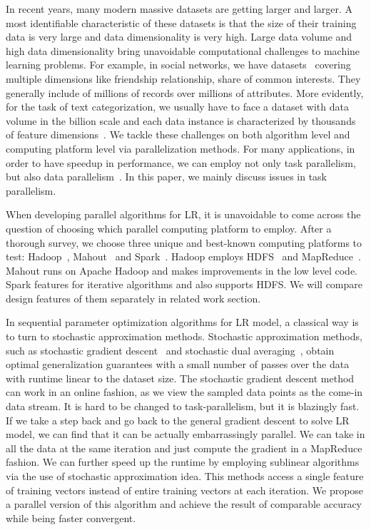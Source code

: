 \documentclass[10pt, conference, compsocconf]{IEEEtran}
\begin{document}
In recent years, many modern massive datasets are getting larger and larger.
A most identifiable characteristic of these datasets is that the size of their training data is very large and data dimensionality is very high.
Large data volume and high data dimensionality bring unavoidable computational challenges to machine learning problems.
For example, in social networks, we have datasets~\cite{lewis2008tastes} covering multiple dimensions like friendship relationship, share of common interests. They generally include of millions of records over millions of attributes. More evidently, for the task of text categorization, we usually have to face a dataset with data volume in the billion scale and each data instance is characterized by thousands of feature dimensions~\cite{lewis2004rcv1}.
We tackle these challenges on both algorithm level and computing platform level via parallelization methods.
For many applications, in order to have speedup in performance, we can employ not only task parallelism, but also data parallelism~\cite{subhlok1993exploiting}.
In this paper, we mainly discuss issues in task parallelism.

When developing parallel algorithms for LR, it is unavoidable to come across the question of choosing which parallel computing platform to employ.
After a thorough survey, we choose three unique and best-known computing platforms to test: Hadoop~\cite{white2012hadoop}, Mahout~\cite{mahoutscalable} and Spark~\cite{zaharia2010spark}.
Hadoop employs HDFS~\cite{borthakur2008hdfs} and MapReduce~\cite{dean2008mapreduce}.
Mahout runs on Apache Hadoop and makes improvements in the low level code.
Spark features for iterative algorithms and also supports HDFS.
We will compare design features of them separately in related work section.

In sequential parameter optimization algorithms for LR model, a classical way is to turn to stochastic approximation methods.
Stochastic approximation methods, such as stochastic gradient descent~\cite{zhang2004solving} and stochastic dual averaging~\cite{xiao2010dual}, obtain optimal generalization guarantees with a small number of passes over the data with runtime linear to the dataset size.
The stochastic gradient descent method can work in an online fashion, as we view the sampled data points as the come-in data stream.
It is hard to be changed to task-parallelism, but it is blazingly fast.
If we take a step back and go back to the general gradient descent to solve LR model, we can find that it can be actually embarrassingly parallel.
We can take in all the data at the same iteration and just compute the gradient in a MapReduce fashion.
We can further speed up the runtime by employing sublinear algorithms~\cite{peng2012sublinear} via the use of stochastic approximation idea.
This methods access a single feature of training vectors instead of entire training vectors at each iteration.
We propose a parallel version of this algorithm and achieve the result of comparable accuracy while being faster convergent.
	
\end{document}
